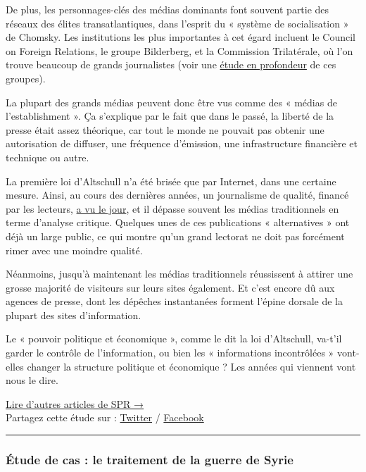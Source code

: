 De plus, les personnages-clés des médias dominants font souvent partie
des réseaux des élites transatlantiques, dans l'esprit du « système de
socialisation » de Chomsky. Les institutions les plus importantes à cet
égard incluent le Council on Foreign Relations, le groupe Bilderberg, et
la Commission Trilatérale, où l'on trouve beaucoup de grands
journalistes (voir une
\href{https://swprs.org/the-american-empire-and-its-media/}{étude en
profondeur} de ces groupes).

La plupart des grands médias peuvent donc être vus comme des « médias de
l'establishment ». Ça s'explique par le fait que dans le passé, la
liberté de la presse était assez théorique, car tout le monde ne pouvait
pas obtenir une autorisation de diffuser, une fréquence d'émission, une
infrastructure financière et technique ou autre.

La première loi d'Altschull n'a été brisée que par Internet, dans une
certaine mesure. Ainsi, au cours des dernières années, un journalisme de
qualité, financé par les lecteurs,
\href{https://swprs.org/media-navigator/}{a vu le jour}, et il dépasse
souvent les médias traditionnels en terme d'analyse critique. Quelques
unes de ces publications « alternatives » ont déjà un large public, ce
qui montre qu'un grand lectorat ne doit pas forcément rimer avec une
moindre qualité.

Néanmoins, jusqu'à maintenant les médias traditionnels réussissent à
attirer une grosse majorité de visiteurs sur leurs sites également. Et
c'est encore dû aux agences de presse, dont les dépêches instantanées
forment l'épine dorsale de la plupart des sites d'information.

Le « pouvoir politique et économique », comme le dit la loi d'Altschull,
va-t'il garder le contrôle de l'information, ou bien les « informations
incontrôlées » vont-elles changer la structure politique et économique ?
Les années qui viennent vont nous le dire.

\href{https://swprs.org/contact/}{Lire d'autres articles de SPR →}\\
Partagez cette étude sur :
\href{https://twitter.com/intent/tweet?url=https://swprs.org/le-multiplicateur-de-propagande/}{Twitter}
/
\href{https://www.facebook.com/share.php?u=https://swprs.org/le-multiplicateur-de-propagande/}{Facebook}

\begin{center}\rule{0.5\linewidth}{\linethickness}\end{center}

\hypertarget{uxe9tude-de-cas--le-traitement-de-la-guerre-de-syrie}{%
\subsubsection{Étude de cas : le traitement de la guerre de
Syrie}\label{uxe9tude-de-cas--le-traitement-de-la-guerre-de-syrie}}

